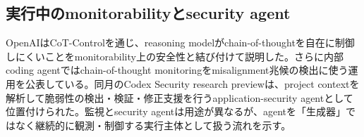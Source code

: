 \subsection{実行中のmonitorabilityとsecurity agent}

OpenAIはCoT-Controlを通じ、reasoning modelがchain-of-thoughtを自在に制御しにくいことをmonitorability上の安全性と結び付けて説明した。さらに内部coding agentではchain-of-thought monitoringをmisalignment兆候の検出に使う運用を公表している。同月のCodex Security research previewは、project contextを解析して脆弱性の検出・検証・修正支援を行うapplication-security agentとして位置付けられた。監視とsecurity agentは用途が異なるが、agentを「生成器」ではなく継続的に観測・制御する実行主体として扱う流れを示す。\autocite{src-287a6bf67154,src-5becf449a527,src-b4b340379768}


